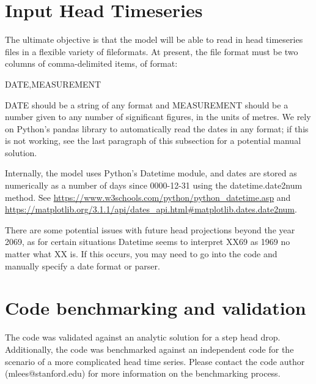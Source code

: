 \documentclass{article}
\begin{document}
\section{Input Head Timeseries}

The ultimate objective is that the model will be able to read in head timeseries files in a flexible variety of fileformats. At present, the file format must be two columns of comma-delimited items, of format:

DATE,MEASUREMENT

DATE should be a string of any format and MEASUREMENT should be a number given to any number of significant figures, in the units of metres. We rely on Python's pandas library to automatically read the dates in any format; if this is not working, see the last paragraph of this subsection for a potential manual solution.

Internally, the model uses Python's Datetime module, and dates are stored as numerically as a number of days since 0000-12-31 using the datetime.date2num method. See \url{https://www.w3schools.com/python/python_datetime.asp} and \url{https://matplotlib.org/3.1.1/api/dates_api.html\#matplotlib.dates.date2num}.

There are some potential issues with future head projections beyond the year 2069, as for certain situations Datetime seems to interpret XX69 as 1969 no matter what XX is. If this occurs, you may need to go into the code and manually specify a date format or parser.

\section{Code benchmarking and validation}

The code was validated against an analytic solution for a step head drop. Additionally, the code was benchmarked against an independent code for the scenario of a more complicated head time series. Please contact the code author (mlees@stanford.edu) for more information on the benchmarking process.

\printbibliography
\end{document}
